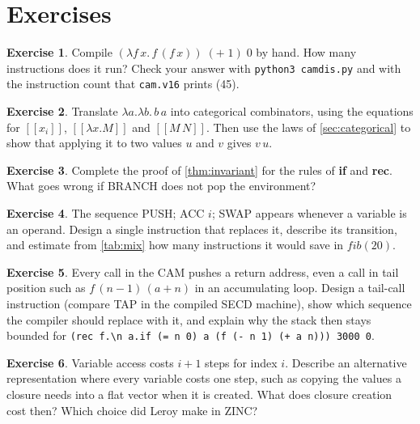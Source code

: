\documentclass[11pt,a4paper]{article}
\newcommand{\ins}[1]{\textsf{#1}}
\newcommand{\sem}[1]{[\![#1]\!]}
\theoremstyle{definition}
\newtheorem{exercise}{Exercise}
\theoremstyle{plain}
\begin{document}
\section*{Exercises}

\begin{exercise}
Compile $(\lambda f\,x.\,f\,(f\,x))\;(+\;1)\;0$ by hand. How many
instructions does it run? Check your answer with
\texttt{python3 camdis.py} and with the instruction count that
\texttt{cam.v16} prints (45).
\end{exercise}

\begin{exercise}
Translate $\lambda a.\lambda b.\,b\,a$ into categorical combinators, using
the equations for $\sem{x_i}$, $\sem{\lambda x.M}$ and $\sem{M\,N}$. Then use
the laws of \cref{sec:categorical} to show that applying it to two values
$u$ and $v$ gives $v\,u$.
\end{exercise}

\begin{exercise}
Complete the proof of \cref{thm:invariant} for the rules of \textbf{if} and
\textbf{rec}. What goes wrong if \ins{BRANCH} does not pop the environment?
\end{exercise}

\begin{exercise}\label{ex:peephole}
The sequence \ins{PUSH; ACC} $i$\ins{; SWAP} appears whenever a variable is an
operand. Design a single instruction that replaces it, describe its
transition, and estimate from \cref{tab:mix} how many instructions it would
save in $\mathit{fib}(20)$.
\end{exercise}

\begin{exercise}\label{ex:tail}
Every call in the CAM pushes a return address, even a call in tail position
such as $f\,(n-1)\,(a+n)$ in an accumulating loop. Design a tail-call
instruction (compare \ins{TAP} in the compiled SECD machine), show which
sequence the compiler should replace with it, and explain why the stack then
stays bounded for \verb|(rec f.\n a.if (= n 0) a (f (- n 1) (+ a n))) 3000 0|.
\end{exercise}

\begin{exercise}
Variable access costs $i+1$ steps for index $i$. Describe an alternative
representation where every variable costs one step, such as copying the
values a closure needs into a flat vector when it is created. What does
closure creation cost then? Which choice did Leroy make in ZINC?
\end{exercise}
\end{document}

